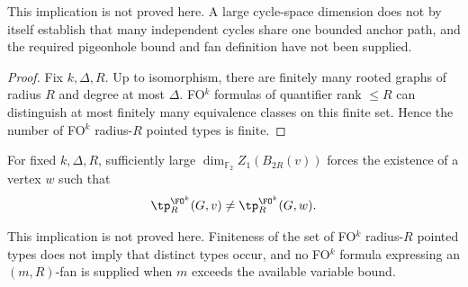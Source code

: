 \noindent
This implication is not proved here. A large cycle-space dimension does
not by itself establish that many independent cycles share one bounded
anchor path, and the required pigeonhole bound and fan definition have
not been supplied.

\begin{proof}
Fix $k,\Delta,R$. Up to isomorphism, there are finitely many rooted graphs of radius $R$ and degree at most $\Delta$.
FO$^k$ formulas of quantifier rank $\le R$ can distinguish at most finitely many equivalence classes on this finite set.
Hence the number of FO$^k$ radius-$R$ pointed types is finite.
\end{proof}

\begin{lemma}
For fixed $k,\Delta,R$, sufficiently large
$\dim_{\mathbb F_2} Z_1(B_{2R}(v))$ forces the existence of a vertex
$w$ such that
\[
\tp^{\FO^k}_R(G,v) \neq \tp^{\FO^k}_R(G,w).
\]
\end{lemma}

\noindent
This implication is not proved here. Finiteness of the set of
FO$^k$ radius-$R$ pointed types does not imply that distinct types
occur, and no FO$^k$ formula expressing an $(m,R)$-fan is supplied
when $m$ exceeds the available variable bound.

